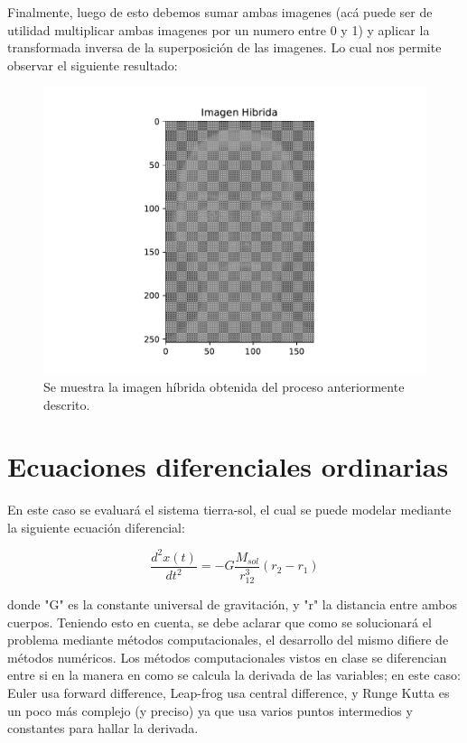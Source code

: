 \documentclass{article}
\begin{document}
Finalmente, luego de esto debemos sumar ambas imagenes (acá puede ser de utilidad multiplicar ambas imagenes por un numero entre 0 y 1) y aplicar la transformada inversa de la superposición de las imagenes. Lo cual nos permite observar el siguiente resultado:

\begin{figure}[H]
    \centering
    \includegraphics[width=\textwidth]{Hibrida.pdf}
    \caption{Se muestra la imagen híbrida obtenida del proceso anteriormente descrito.}
    \label{fig:hib}
\end{figure}

\section{Ecuaciones diferenciales ordinarias}
En este caso se evaluará el sistema tierra-sol, el cual se puede modelar mediante la siguiente ecuación diferencial: 

\begin{equation}
    \frac{d^{2}x(t)}{dt^{2}} = -G\frac{M_{sol}}{r_{12}^{3}}(r_{2}-r_{1})
\end{equation}

donde "G" es la constante universal de gravitación, y "r" la distancia entre ambos cuerpos. Teniendo esto en cuenta, se debe aclarar que como se solucionará el problema mediante métodos computacionales, el desarrollo del mismo difiere de métodos numéricos. Los métodos computacionales vistos en clase se diferencian entre si en la manera en como se calcula la derivada de las variables; en este caso: Euler usa forward difference, Leap-frog usa central difference, y Runge Kutta es un poco más complejo (y preciso) ya que usa varios puntos intermedios y constantes para hallar la derivada.\\
\end{document}
